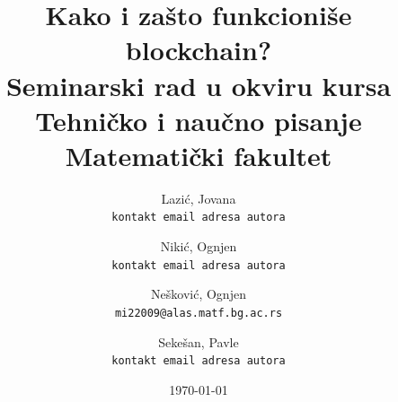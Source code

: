 \documentclass[a4paper]{article}
\begin{document}
\title{Kako i zašto funkcioniše blockchain?\\ \small{Seminarski rad u okviru kursa\\Tehničko i naučno pisanje\\ Matematički fakultet}}
\author{
    Lazić, Jovana\\ 
    \texttt{kontakt email adresa autora}
    \and
    Nikić, Ognjen\\ 
    \texttt{kontakt email adresa autora}
    \and
    Nešković, Ognjen\\ 
    \texttt{mi22009@alas.matf.bg.ac.rs}
    \and
    Sekešan, Pavle\\ 
    \texttt{kontakt email adresa autora}
}
\date{\today}
\maketitle
\end{document}
